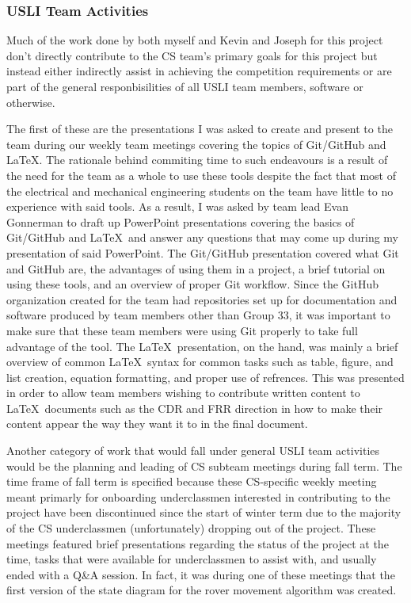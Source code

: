 \documentclass[onecolumn, draftclsnofoot,10pt, compsoc]{IEEEtran}
\begin{document}
\subsubsection{USLI Team Activities}
Much of the work done by both myself and Kevin and Joseph for this project don't directly contribute to the CS team's primary goals for this project but instead either indirectly assist in achieving the competition requirements or are part of the general responbisilities of all USLI team members, software or otherwise. 

The first of these are the presentations I was asked to create and present to the team during our weekly team meetings covering the topics of Git/GitHub and \LaTeX. The rationale behind commiting time to such endeavours is a result of the need for the team as a whole to use these tools despite the fact that most of the electrical and mechanical engineering students on the team have little to no experience with said tools. As a result, I was asked by team lead Evan Gonnerman to draft up PowerPoint presentations covering the basics of Git/GitHub and \LaTeX~and answer any questions that may come up during my presentation of said PowerPoint. The Git/GitHub presentation covered what Git and GitHub are, the advantages of using them in a project, a brief tutorial on using these tools, and an overview of proper Git workflow. Since the GitHub organization created for the team had repositories set up for documentation and software produced by team members other than Group 33, it was important to make sure that these team members were using Git properly to take full advantage of the tool. The \LaTeX~presentation, on the hand, was mainly a brief overview of common \LaTeX~syntax for common tasks such as table, figure, and list creation, equation formatting, and proper use of refrences. This was presented in order to allow team members wishing to contribute written content to \LaTeX~documents such as the CDR and FRR direction in how to make their content appear the way they want it to in the final document.

Another category of work that would fall under general USLI team activities would be the planning and leading of CS subteam meetings during fall term. The time frame of fall term is specified because these CS-specific weekly meeting meant primarly for onboarding underclassmen interested in contributing to the project have been discontinued since the start of winter term due to the majority of the CS underclassmen (unfortunately) dropping out of the project. These meetings featured brief presentations regarding the status of the project at the time, tasks that were available for underclassmen to assist with, and usually ended with a Q\&A session. In fact, it was during one of these meetings that the first version of the state diagram for the rover movement algorithm was created.
\end{document}
